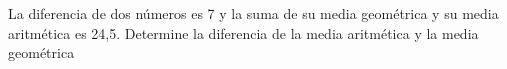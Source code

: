 \noindent
La diferencia de dos números es 7 y la suma de su media geométrica y su media aritmética es 24,5. Determine la diferencia de la media aritmética y la media geométrica
